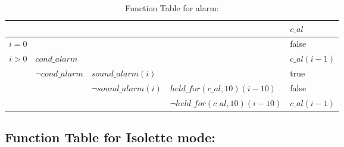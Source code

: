 \documentclass[fontsize=12pt,paper=letter,twoside]{scrartcl}
\begin{document}
\begin{table}[htb!]
\centering
\label{my-label}
\begin{tabular}{llll|l|}
\cline{5-5}
                                                        &                                                       &                                                           &                                & $c\_al$                 \\ \hline
\multicolumn{4}{|l|}{$i = 0$}                                                                                                                                                                                  & false          \\ \hline
\multicolumn{1}{|l|}{\multirow{4}{*}{$i > 0$}} & \multicolumn{3}{l|}{$cond\_alarm$\footnotemark}                                                                                                                   & $c\_al(i-1)$ \\ \cline{2-5}
\multicolumn{1}{|l|}{}                                  & \multicolumn{1}{l|}{\multirow{3}{*}{$\neg cond\_alarm$}} & \multicolumn{2}{l|}{$sound\_alarm(i)$}                                                       & true              \\ \cline{3-5}
\multicolumn{1}{|l|}{}                                  & \multicolumn{1}{l|}{}                                 & \multicolumn{1}{l|}{\multirow{2}{*}{$\neg sound\_alarm(i)$}} & $held\_for(c\_al, 10)(i-10)$     & false          \\ \cline{4-5}
\multicolumn{1}{|l|}{}                                  & \multicolumn{1}{l|}{}                                 & \multicolumn{1}{l|}{}                                     & $\neg held\_for(c\_al, 10)(i-10)$ & $c\_al(i-1)$ \\ \hline
\end{tabular}
\caption{Function Table for alarm: }
\end{table}

\FloatBarrier
\subsection{Function Table for Isolette mode: }
\FloatBarrier
\end{document}
